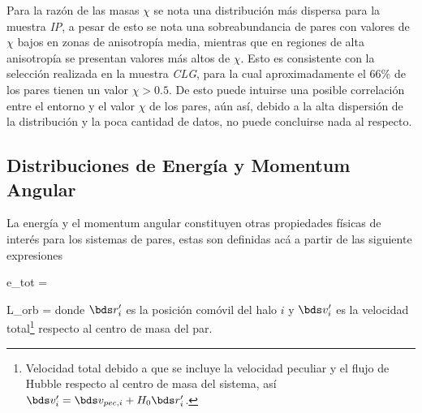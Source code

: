 Para la razón de las masas $\chi$ se nota una distribución más dispersa 
para la muestra \textit{IP}, a pesar de esto se nota una sobreabundancia 
de pares con valores de $\chi$ bajos en zonas de anisotropía media, 
mientras que en regiones de alta anisotropía se presentan valores más altos
de $\chi$. Esto es consistente con la selección realizada en la muestra
\textit{CLG}, para la cual aproximadamente el $66\%$ de los pares tienen
un valor $\chi>0.5$. De esto puede intuirse una posible correlación entre
el entorno y el valor $\chi$ de los pares, aún así, debido a la alta 
dispersión de la distribución y la poca cantidad de datos, no puede 
concluirse nada al respecto.
\newpage

	\subsection{Distribuciones de Energía y Momentum Angular}
	\label{subsec:AngularMomentumAndEnergy}


La energía y el momentum angular constituyen otras propiedades físicas de
interés para los sistemas de pares, estas son definidas acá a partir de las
siguiente expresiones


{ e_{tot} = 
 }


{ \bds L_{orb} = }
donde $\bds r_i'$ es la posición comóvil del halo $i$ y $\bds v_i'$ es la 
velocidad total\footnote{Velocidad total debido a que se incluye la velocidad 
peculiar y el flujo de Hubble respecto al centro de masa del sistema, así 
$\bds v_i' = \bds v_{pec,i} + H_0 \bds r_i'$. } respecto al centro de 
masa del par.


